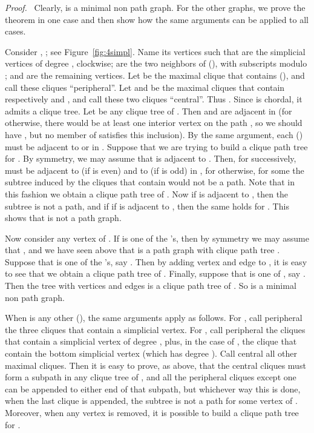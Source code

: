 \documentclass[11pt]{article}
\newenvironment{proof}{\noindent \emph{Proof.}\ }{\hfill
    \vspace{1em}}
\begin{document}
\begin{proof}
Clearly,  is a minimal non path graph.  For the other graphs, we
prove the theorem in one case and then show how the same arguments can
be applied to all cases.

Consider , ; see Figure~\ref{fig:4simpl}.  Name
its vertices such that  are the simplicial
vertices of degree , clockwise;  are the two
neighbors of  (), with subscripts modulo
; and  are the remaining vertices.  Let  be the
maximal clique that contains  (), and call
these  cliques ``peripheral''.  Let  and  be the maximal
cliques that contain respectively  and , and call these two
cliques ``central''.  Thus .  Since  is chordal, it admits a clique tree.  Let 
be any clique tree of .  Then  and  are adjacent in 
(for otherwise, there would be at least one interior vertex  on the
path , so we should have , but no
member  of  satisfies this
inclusion).  By the same argument, each  ()
must be adjacent to  or  in .  Suppose that we are trying
to build a clique path tree  for .  By symmetry, we may assume
that  is adjacent to .  Then, for 
successively,  must be adjacent to  (if  is even) and to
 (if  is odd) in , for otherwise, for some  the subtree  induced by the cliques that contain  would
not be a path.  Note that in this fashion we obtain a clique path tree
 of .  Now if  is adjacent to
, then the subtree  is not a path, and if if
 is adjacent to , then the same holds for
.  This shows that  is not a path graph.

Now consider any vertex  of .  If  is one of the 's,
then by symmetry we may assume that , and we have seen
above that  is a path graph with clique path tree .
Suppose that  is one of the 's, say .  Then by
adding vertex  and edge  to , it is easy to
see that we obtain a clique path tree of .  Finally,
suppose that  is one of , say .  Then the tree with
vertices  and edges  is a clique path tree of .  So  is a
minimal non path graph.

When  is any other  (), the same arguments
apply as follows.  For , call peripheral the three
cliques that contain a simplicial vertex.  For ,
call peripheral the cliques that contain a simplicial vertex of degree
, plus, in the case of , the clique that contain the bottom
simplicial vertex (which has degree ).  Call central all other
maximal cliques.  Then it is easy to prove, as above, that the central
cliques must form a subpath in any clique tree of , and all the
peripheral cliques except one can be appended to either end of that
subpath, but whichever way this is done, when the last clique is
appended, the subtree  is not a path for some vertex  of .
Moreover, when any vertex  is removed, it is possible to build a
clique path tree for .
\end{proof}
\end{document}
